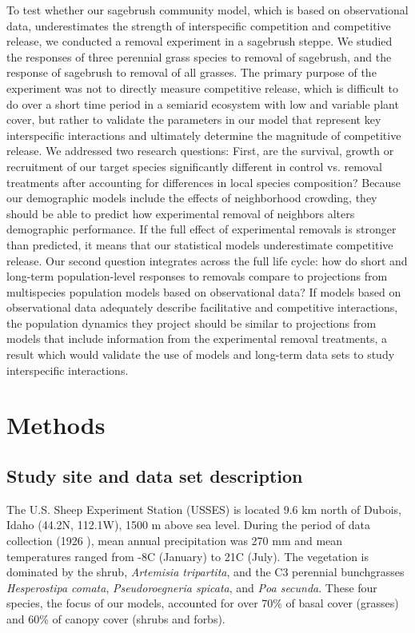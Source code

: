 \documentclass[11pt]{article}
\begin{document}
\begin{doublespacing}
To test whether our sagebrush community model, which is based on observational data, underestimates the strength of interspecific competition and competitive release, we conducted a removal experiment in a sagebrush steppe. We studied the responses of three perennial grass species to removal of sagebrush, and the response of sagebrush to removal of all grasses. The primary purpose of the experiment was not to directly measure competitive release, which is difficult to do over a short time period in a semiarid ecosystem with low and variable plant cover, but rather to validate the parameters in our model that represent key interspecific interactions and ultimately determine the magnitude of competitive release. We addressed two research questions: First, are the survival, growth or recruitment of our target species significantly different in control vs. removal treatments after accounting for differences in local species composition? Because our demographic models include the effects of neighborhood crowding, they should be able to predict how experimental removal of neighbors alters demographic performance. If the full effect of experimental removals is stronger than predicted, it means that our statistical models underestimate competitive release.  Our second question integrates across the full life cycle: how do short and long-term population-level responses to removals compare to projections from multispecies population models based on observational data? If models based on observational data adequately describe facilitative and competitive interactions, the population dynamics they project should be similar to projections from models that include information from the experimental removal treatments, a result which would validate the use of models and long-term data sets to study interspecific interactions. 

\section*{Methods}

\subsection*{Study site and data set description}

The U.S. Sheep Experiment Station (USSES) is located 9.6 km north of Dubois, Idaho (44.2\degree N, 112.1\degree W), 1500 m above sea level. During the period of data collection (1926 ), mean annual precipitation was 270 mm and mean temperatures ranged from -8\degree C (January) to 21\degree C (July). The vegetation is dominated by the shrub, \textit{Artemisia tripartita}, and the C3  perennial bunchgrasses \textit{Hesperostipa comata}, \textit{Pseudoroegneria spicata},  and \textit{Poa secunda}. These four species, the focus of our models, accounted for over 70\% of basal cover (grasses) and 60\% of canopy cover (shrubs and forbs). 


\end{doublespacing}
\end{document}
